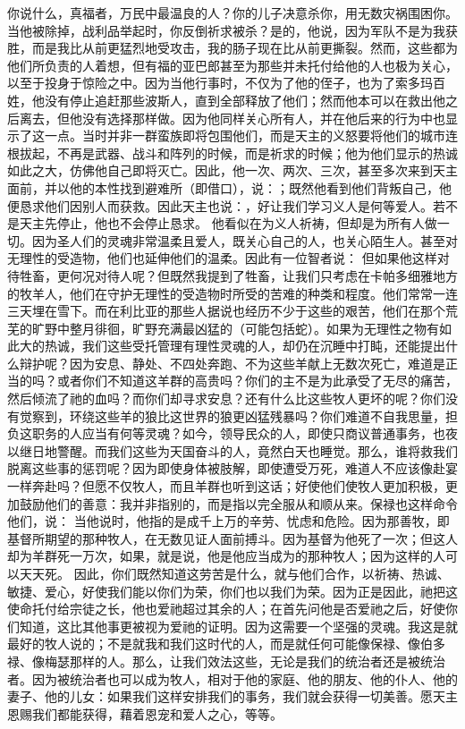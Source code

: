 你说什么，真福者，万民中最温良的人？你的儿子决意杀你，用无数灾祸围困你。当他被除掉，战利品举起时，你反倒祈求被杀？是的，他说，因为军队不是为我获胜，而是我比从前更猛烈地受攻击，我的肠子现在比从前更撕裂。然而，这些都为他们所负责的人着想，但有福的亚巴郎甚至为那些并未托付给他的人也极为关心，以至于投身于惊险之中。因为当他行事时，不仅为了他的侄子，也为了索多玛百姓，他没有停止追赶那些波斯人，直到全部释放了他们；然而他本可以在救出他之后离去，但他没有选择那样做。因为他同样关心所有人，并在他后来的行为中也显示了这一点。当时并非一群蛮族即将包围他们，而是天主的义怒要将他们的城市连根拔起，不再是武器、战斗和阵列的时候，而是祈求的时候；他为他们显示的热诚如此之大，仿佛他自己即将灭亡。因此，他一次、两次、三次，甚至多次来到天主面前，并以他的本性找到避难所（即借口），说：；既然他看到他们背叛自己，他便恳求他们因别人而获救。因此天主也说：，好让我们学习义人是何等爱人。若不是天主先停止，他也不会停止恳求。 他看似在为义人祈祷，但却是为所有人做一切。因为圣人们的灵魂非常温柔且爱人，既关心自己的人，也关心陌生人。甚至对无理性的受造物，他们也延伸他们的温柔。因此有一位智者说： 但如果他这样对待牲畜，更何况对待人呢？但既然我提到了牲畜，让我们只考虑在卡帕多细雅地方的牧羊人，他们在守护无理性的受造物时所受的苦难的种类和程度。他们常常一连三天埋在雪下。而在利比亚的那些人据说也经历不少于这些的艰苦，他们在那个荒芜的旷野中整月徘徊，旷野充满最凶猛的（可能包括蛇）。如果为无理性之物有如此大的热诚，我们这些受托管理有理性灵魂的人，却仍在沉睡中打盹，还能提出什么辩护呢？因为安息、静处、不四处奔跑、不为这些羊献上无数次死亡，难道是正当的吗？或者你们不知道这羊群的高贵吗？你们的主不是为此承受了无尽的痛苦，然后倾流了祂的血吗？而你们却寻求安息？还有什么比这些牧人更坏的呢？你们没有觉察到，环绕这些羊的狼比这世界的狼更凶猛残暴吗？你们难道不自我思量，担负这职务的人应当有何等灵魂？如今，领导民众的人，即使只商议普通事务，也夜以继日地警醒。而我们这些为天国奋斗的人，竟然白天也睡觉。那么，谁将救我们脱离这些事的惩罚呢？因为即使身体被肢解，即使遭受万死，难道人不应该像赴宴一样奔赴吗？但愿不仅牧人，而且羊群也听到这话；好使他们使牧人更加积极，更加鼓励他们的善意：我并非指别的，而是指以完全服从和顺从来。保禄也这样命令他们，说： 当他说时，他指的是成千上万的辛劳、忧虑和危险。因为那善牧，即基督所期望的那种牧人，在无数见证人面前搏斗。因为基督为他死了一次；但这人却为羊群死一万次，如果，就是说，他是他应当成为的那种牧人；因为这样的人可以天天死。 因此，你们既然知道这劳苦是什么，就与他们合作，以祈祷、热诚、敏捷、爱心，好使我们能以你们为荣，你们也以我们为荣。因为正是因此，祂把这使命托付给宗徒之长，他也爱祂超过其余的人；在首先问他是否爱祂之后，好使你们知道，这比其他事更被视为爱祂的证明。因为这需要一个坚强的灵魂。我这是就最好的牧人说的；不是就我和我们这时代的人，而是就任何可能像保禄、像伯多禄、像梅瑟那样的人。那么，让我们效法这些，无论是我们的统治者还是被统治者。因为被统治者也可以成为牧人，相对于他的家庭、他的朋友、他的仆人、他的妻子、他的儿女：如果我们这样安排我们的事务，我们就会获得一切美善。愿天主恩赐我们都能获得，藉着恩宠和爱人之心，等等。\par

